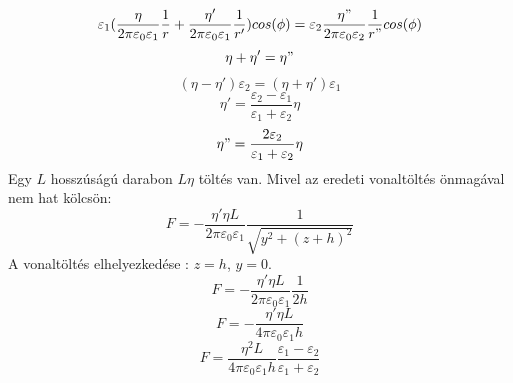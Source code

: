 \documentclass[11pt,a4paper,openany,leqno]{article}
\begin{document}
$$ \varepsilon_1 (\frac{\eta}{2 \pi \varepsilon_0 \varepsilon_1} \frac{1}{r} + \frac{\eta'}{2 \pi \varepsilon_0 \varepsilon_1} \frac{1}{r'}) cos(\phi) = \varepsilon_2 \frac{\eta"}{2 \pi \varepsilon_0 \varepsilon_2} \frac{1}{r"} cos(\phi)$$
$$ \eta + \eta' = \eta" $$
\medskip
$$ (\eta - \eta')\varepsilon_2 = (\eta + \eta') \varepsilon_1 $$
$$ \eta' = \frac{\varepsilon_2 - \varepsilon_1}{\varepsilon_1 + \varepsilon_2} \eta $$
$$ \eta" = \frac{2\varepsilon_2}{\varepsilon_1 + \varepsilon_2} \eta $$
\indent
Egy $L$ hosszúságú darabon $L\eta$ töltés van. Mivel az eredeti vonaltöltés önmagával nem hat kölcsön:
$$ F = - \frac{\eta'\eta L}{2 \pi \varepsilon_0 \varepsilon_1}\frac{1}{\sqrt{y^2 + (z+h)^2}} $$
\indent
A vonaltöltés elhelyezkedése : $z = h$, $y = 0$.
$$ F = -\frac{\eta'\eta L}{2 \pi \varepsilon_0 \varepsilon_1}\frac{1}{2h} $$
$$ F = -\frac{\eta'\eta L}{4 \pi \varepsilon_0 \varepsilon_1 h} $$
$$ F = \frac{\eta^2 L}{4 \pi \varepsilon_0 \varepsilon_1 h} \frac{\varepsilon_1 - \varepsilon_2}{\varepsilon_1 + \varepsilon_2}$$
\end{document}
